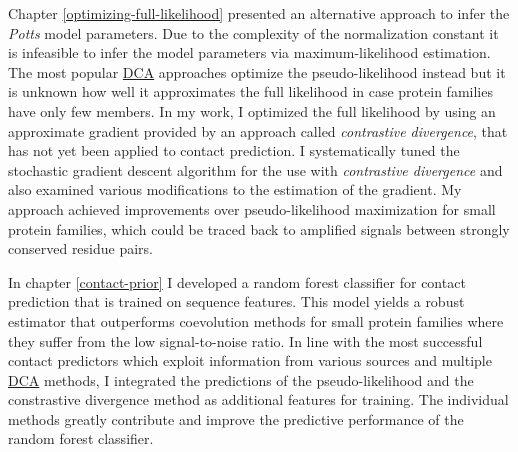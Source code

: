 \documentclass[11pt,a4paper,twoside]{book}
\theoremstyle{definition}
\theoremstyle{definition}
\theoremstyle{remark}
\begin{document}
Chapter \ref{optimizing-full-likelihood} presented an alternative
approach to infer the \emph{Potts} model parameters. Due to the
complexity of the normalization constant it is infeasible to infer the
model parameters via maximum-likelihood estimation. The most popular
\protect\hyperlink{abbrev}{DCA} approaches optimize the
pseudo-likelihood instead but it is unknown how well it approximates the
full likelihood in case protein families have only few members. In my
work, I optimized the full likelihood by using an approximate gradient
provided by an approach called \emph{contrastive divergence}, that has
not yet been applied to contact prediction. I systematically tuned the
stochastic gradient descent algorithm for the use with \emph{contrastive
divergence} and also examined various modifications to the estimation of
the gradient. My approach achieved improvements over pseudo-likelihood
maximization for small protein families, which could be traced back to
amplified signals between strongly conserved residue pairs.

In chapter \ref{contact-prior} I developed a random forest classifier
for contact prediction that is trained on sequence features. This model
yields a robust estimator that outperforms coevolution methods for small
protein families where they suffer from the low signal-to-noise ratio.
In line with the most successful contact predictors which exploit
information from various sources and multiple
\protect\hyperlink{abbrev}{DCA} methods, I integrated the predictions of
the pseudo-likelihood and the constrastive divergence method as
additional features for training. The individual methods greatly
contribute and improve the predictive performance of the random forest
classifier.
\end{document}
